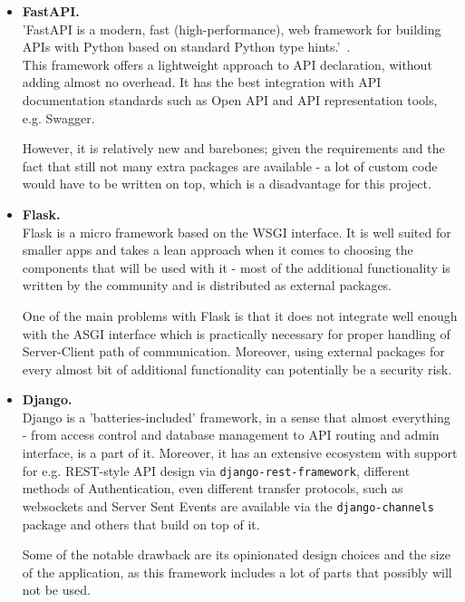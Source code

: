 \begin{itemize}
    \item \textbf{FastAPI.} \\
    'FastAPI is a modern, fast (high-performance), web framework for building APIs
    with Python based on standard Python type hints.'~\cite{13}. \\
    This framework offers a lightweight approach to API declaration, without adding almost no overhead.
    It has the best integration with API documentation standards such as
    Open API and API representation tools, e.g. Swagger.

    However, it is relatively new and barebones; given the requirements and the fact that
    still not many extra packages are available -
    a lot of custom code would have to be written on top, which is a disadvantage for this project.

    \item \textbf{Flask.} \\
    Flask is a micro framework based on the WSGI interface.
    It is well suited for smaller apps and takes a lean approach when it comes to choosing the components
    that will be used with it - most of the additional functionality is written by the community
    and is distributed as external packages.

    One of the main problems with Flask is that it does not integrate well enough with the ASGI
    interface which is practically necessary for proper handling of Server-Client path of communication.
    Moreover, using external packages for every almost bit of additional functionality can potentially be a security risk.

    \item \textbf{Django.} \\
    Django is a 'batteries-included' framework, in a sense that almost everything -
    from access control and database management to API routing and admin interface,
    is a part of it. Moreover, it has an extensive ecosystem with support for e.g. REST-style API
    design via \texttt{django-rest-framework}, different methods of Authentication,
    even different transfer protocols, such as websockets and Server Sent Events are available
    via the \texttt{django-channels} package and others that build on top of it.

    Some of the notable drawback are its opinionated design choices and the size of the application,
    as this framework includes a lot of parts that possibly will not be used.
\end{itemize}

